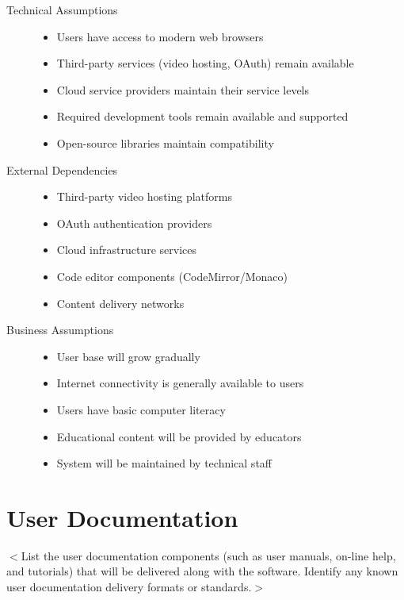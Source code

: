\documentclass[a4paper, 11pt]{scrreprt}
\begin{document}
\begin{description}
    \item[Technical Assumptions]
        \begin{itemize}
            \item Users have access to modern web browsers
            \item Third-party services (video hosting, OAuth) remain available
            \item Cloud service providers maintain their service levels
            \item Required development tools remain available and supported
            \item Open-source libraries maintain compatibility
        \end{itemize}
    
    \item[External Dependencies]
        \begin{itemize}
            \item Third-party video hosting platforms
            \item OAuth authentication providers
            \item Cloud infrastructure services
            \item Code editor components (CodeMirror/Monaco)
            \item Content delivery networks
        \end{itemize}
    
    \item[Business Assumptions]
        \begin{itemize}
            \item User base will grow gradually
            \item Internet connectivity is generally available to users
            \item Users have basic computer literacy
            \item Educational content will be provided by educators
            \item System will be maintained by technical staff
        \end{itemize}
\end{description}

\section{User Documentation}
$<$List the user documentation components (such as user manuals, on-line help, 
and tutorials) that will be delivered along with the software. Identify any 
known user documentation delivery formats or standards.$>$
\end{document}
